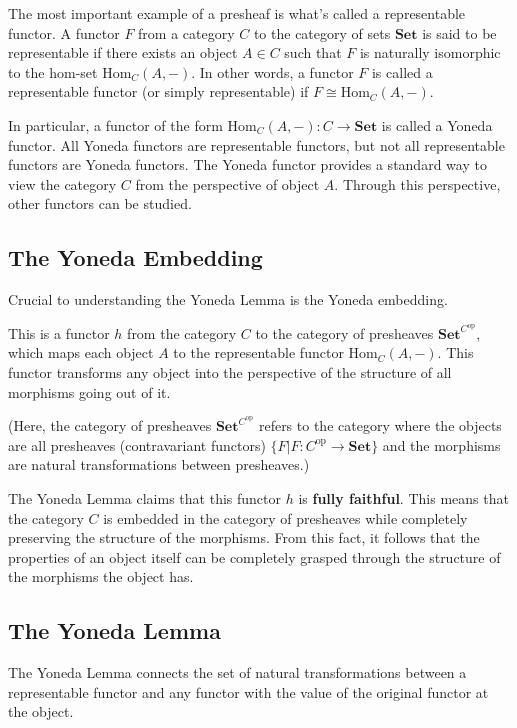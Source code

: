 \documentclass[uplatex,a4j,12pt,dvipdfmx]{jsarticle}
\begin{document}
The most important example of a presheaf is what's called a representable functor.
A functor $F$ from a category $C$ to the category of sets $\textbf{Set}$ is said to be representable if there exists an object $A \in C$ such that $F$ is naturally isomorphic to the hom-set $\text{Hom}_C(A,-)$.
In other words, a functor $F$ is called a representable functor (or simply representable) if $F \cong \text{Hom}_C(A,-)$.

In particular, a functor of the form $\mathrm{Hom}_C(A, -): C \to \mathbf{Set}$ is called a Yoneda functor.
All Yoneda functors are representable functors, but not all representable functors are Yoneda functors.
The Yoneda functor provides a standard way to view the category $C$ from the perspective of object $A$.
Through this perspective, other functors can be studied.



\subsection{The Yoneda Embedding}

Crucial to understanding the Yoneda Lemma is the Yoneda embedding.

This is a functor $h$ from the category $C$ to the category of presheaves $\mathbf{Set}^{C^{\text{op}}}$, which maps each object $A$ to the representable functor $\mathrm{Hom}_C(A, -)$. This functor transforms any object into the perspective of the structure of all morphisms going out of it.

(Here, the category of presheaves $\mathbf{Set}^{C^{\text{op}}}$ refers to the category where the objects are all presheaves (contravariant functors) $\{ F |F : C^{\text{op}} \to \mathbf{Set} \}$ and the morphisms are natural transformations between presheaves.)

The Yoneda Lemma claims that this functor $h$ is \textbf{fully faithful}. This means that the category $C$ is embedded in the category of presheaves while completely preserving the structure of the morphisms.
From this fact, it follows that the properties of an object itself can be completely grasped through the structure of the morphisms the object has.




\subsection{The Yoneda Lemma}

The Yoneda Lemma connects the set of natural transformations between a representable functor and any functor with the value of the original functor at the object.
\end{document}
